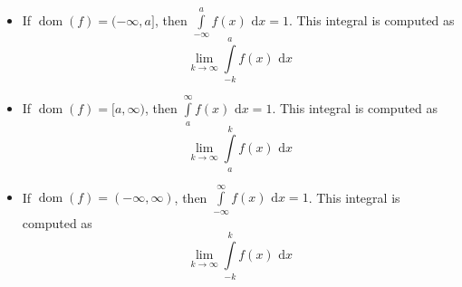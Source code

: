 \documentclass[12pt,a4paper,titlepage]{article}
\DeclareMathOperator{\dom}{dom}
\newcommand{\intd}[1]{\text{ d}#1}
\begin{document}
            \begin{SummaryBox}[title=Computing improper integrals]
                \begin{itemize}[leftmargin=*]
                    \item If $\dom(f) = (-\infty,a]$, then $\int\limits_{-\infty}^a f(x)\intd{x} = 1$. This integral is computed as
                    \[
                        \lim\limits_{k \to \infty} \int\limits_{-k}^a f(x)\intd{x}
                    \]
                    \item If $\dom(f) = [a,\infty)$, then $\int\limits_a^\infty f(x)\intd{x} = 1$. This integral is computed as
                    \[
                        \lim\limits_{k \to \infty} \int\limits_a^k f(x)\intd{x}
                    \]
                    \item If $\dom(f) = (-\infty,\infty)$, then $\int\limits_{-\infty}^\infty f(x)\intd{x} = 1$. This integral is computed as
                    \[
                        \lim\limits_{k \to \infty} \int\limits_{-k}^k f(x)\intd{x}
                    \]
                \end{itemize}
            \end{SummaryBox}
            
\end{document}
